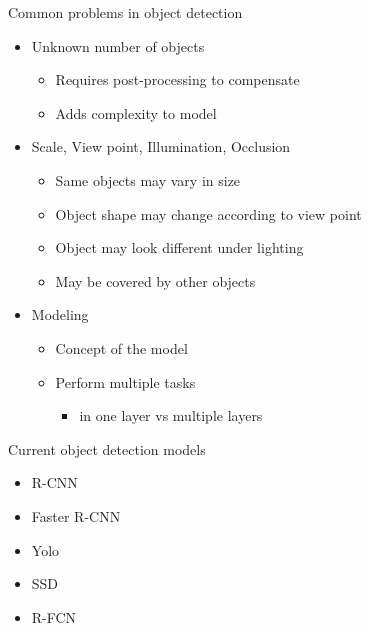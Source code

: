 \begin{frame}{Common problems in object detection}
    \begin{itemize}
        \item Unknown number of objects
            \begin{itemize}
                \item Requires post-processing to compensate
                \item Adds complexity to model
            \end{itemize}
        \item Scale, View point, Illumination, Occlusion
            \begin{itemize}
                \item Same objects may vary in size
                \item Object shape may change according to view point
                \item Object may look different under lighting
                \item May be covered by other objects
            \end{itemize}
        \item Modeling
            \begin{itemize}
                \item Concept of the model
                \item Perform multiple tasks
                    \begin{itemize}
                        \item in one layer vs multiple layers
                    \end{itemize}
            \end{itemize}
    \end{itemize}
\end{frame}

\begin{frame}{Current object detection models}
    \begin{itemize}
        \item R-CNN
        \item Faster R-CNN
        \item Yolo 
        \item SSD 
        \item R-FCN
    \end{itemize}
\end{frame}
